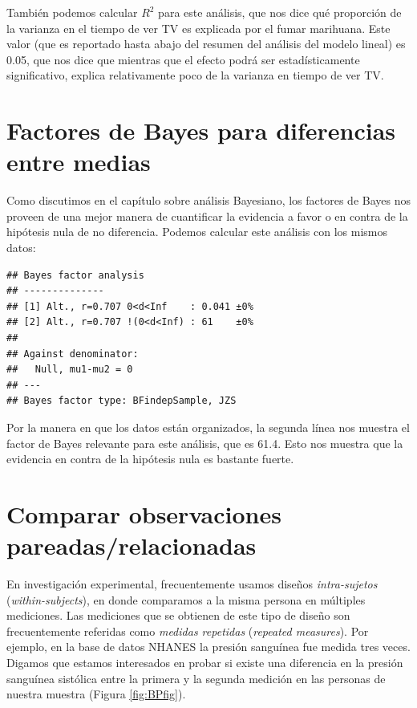 \documentclass[
  12pt,
]{book}
\begin{document}
También podemos calcular \(R^2\) para este análisis, que nos dice qué proporción de la varianza en el tiempo de ver TV es explicada por el fumar marihuana. Este valor (que es reportado hasta abajo del resumen del análisis del modelo lineal) es 0.05, que nos dice que mientras que el efecto podrá ser estadísticamente significativo, explica relativamente poco de la varianza en tiempo de ver TV.

\hypertarget{factores-de-bayes-para-diferencias-entre-medias}{%
\section{Factores de Bayes para diferencias entre medias}\label{factores-de-bayes-para-diferencias-entre-medias}}

Como discutimos en el capítulo sobre análisis Bayesiano, los factores de Bayes nos proveen de una mejor manera de cuantificar la evidencia a favor o en contra de la hipótesis nula de no diferencia. Podemos calcular este análisis con los mismos datos:

\begin{verbatim}
## Bayes factor analysis
## --------------
## [1] Alt., r=0.707 0<d<Inf    : 0.041 ±0%
## [2] Alt., r=0.707 !(0<d<Inf) : 61    ±0%
## 
## Against denominator:
##   Null, mu1-mu2 = 0 
## ---
## Bayes factor type: BFindepSample, JZS
\end{verbatim}

Por la manera en que los datos están organizados, la segunda línea nos muestra el factor de Bayes relevante para este análisis, que es 61.4. Esto nos muestra que la evidencia en contra de la hipótesis nula es bastante fuerte.

\hypertarget{paired-ttests}{%
\section{Comparar observaciones pareadas/relacionadas}\label{paired-ttests}}

En investigación experimental, frecuentemente usamos diseños \emph{intra-sujetos} (\emph{within-subjects}), en donde comparamos a la misma persona en múltiples mediciones. Las mediciones que se obtienen de este tipo de diseño son frecuentemente referidas como \emph{medidas repetidas} (\emph{repeated measures}). Por ejemplo, en la base de datos NHANES la presión sanguínea fue medida tres veces. Digamos que estamos interesados en probar si existe una diferencia en la presión sanguínea sistólica entre la primera y la segunda medición en las personas de nuestra muestra (Figura \ref{fig:BPfig}).
\end{document}
